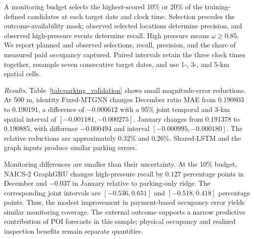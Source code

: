 A monitoring budget selects the highest-scored 10\% or 20\% of the training-defined candidates at each target date and clock time. Selection precedes the outcome-availability mask; observed selected locations determine precision, and observed high-pressure events determine recall. High pressure means $\omega\geq0.85$. We report planned and observed selections, recall, precision, and the share of measured paid occupancy captured. Paired intervals retain the three clock times together, resample seven consecutive target dates, and use 1-, 3-, and 5-km spatial cells.

\textit{Results.}
Table~\ref{tab:parking_validation} shows small magnitude-error reductions. At 500 m, identity Fixed-MTGNN changes December ratio MAE from 0.190803 to 0.190191, a difference of $-0.000612$ with a 95\% joint temporal and 3-km spatial interval of $[-0.001181,-0.000275]$. January changes from 0.191378 to 0.190885, with difference $-0.000494$ and interval $[-0.000995,-0.000180]$. The relative reductions are approximately 0.32\% and 0.26\%. Shared-LSTM and the graph inputs produce similar parking errors.



Monitoring differences are smaller than their uncertainty. At the 10\% budget, NAICS-2 GraphGRU changes high-pressure recall by $0.127$ percentage points in December and $-0.037$ in January relative to parking-only ridge. The corresponding joint intervals are $[-0.536,0.651]$ and $[-0.518,0.418]$ percentage points. Thus, the modest improvement in payment-based occupancy error yields similar monitoring coverage. The external outcome supports a narrow predictive contribution of POI forecasts in this sample; physical occupancy and realized inspection benefits remain separate quantities.
